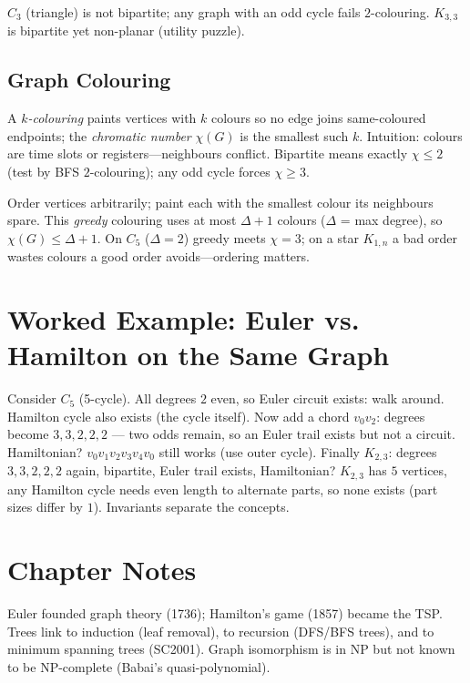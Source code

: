 \begin{example}
$C_3$ (triangle) is not bipartite; any graph with an odd cycle fails $2$-colouring. $K_{3,3}$ is bipartite yet non-planar (utility puzzle).
\end{example}

\subsection{Graph Colouring}
\label{sec:colouring}
A \emph{$k$-colouring} paints vertices with $k$ colours so no edge joins same-coloured endpoints; the \emph{chromatic number} $\chi(G)$ is the smallest such $k$. Intuition: colours are time slots or registers---neighbours conflict. Bipartite means exactly $\chi\le2$ (test by BFS $2$-colouring); any odd cycle forces $\chi\ge3$.
\begin{example}
Order vertices arbitrarily; paint each with the smallest colour its neighbours spare. This \emph{greedy} colouring uses at most $\Delta+1$ colours ($\Delta$ = max degree), so $\chi(G)\le\Delta+1$. On $C_5$ ($\Delta=2$) greedy meets $\chi=3$; on a star $K_{1,n}$ a bad order wastes colours a good order avoids---ordering matters.
\end{example}

\section{Worked Example: Euler vs.\\ Hamilton on the Same Graph}
Consider $C_5$ (5-cycle). All degrees $2$ even, so Euler circuit exists: walk around. Hamilton cycle also exists (the cycle itself). Now add a chord $v_0v_2$: degrees become $3,3,2,2,2$ --- two odds remain, so an Euler trail exists but not a circuit. Hamiltonian? $v_0v_1v_2v_3v_4v_0$ still works (use outer cycle). Finally $K_{2,3}$: degrees $3,3,2,2,2$ again, bipartite, Euler trail exists, Hamiltonian? $K_{2,3}$ has $5$ vertices, any Hamilton cycle needs even length to alternate parts, so none exists (part sizes differ by $1$). Invariants separate the concepts.

\section{Chapter Notes}
Euler founded graph theory (1736); Hamilton's game (1857) became the TSP. Trees link to induction (leaf removal), to recursion (DFS/BFS trees), and to minimum spanning trees (SC2001). Graph isomorphism is in NP but not known to be NP-complete (Babai's quasi-polynomial).

